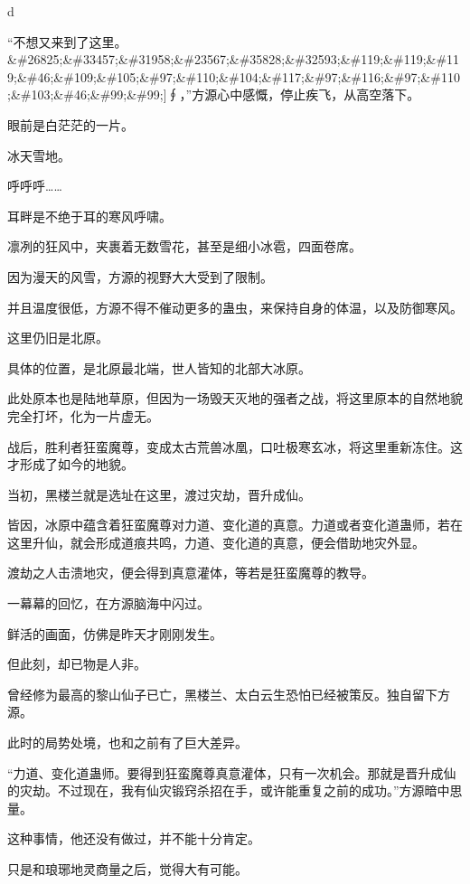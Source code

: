 
\begin{this_body}

d

“不想又来到了这里。\&\#26825;\&\#33457;\&\#31958;\&\#23567;\&\#35828;\&\#32593;\&\#119;\&\#119;\&\#119;\&\#46;\&\#109;\&\#105;\&\#97;\&\#110;\&\#104;\&\#117;\&\#97;\&\#116;\&\#97;\&\#110;\&\#103;\&\#46;\&\#99;\&\#99;]∮，”方源心中感慨，停止疾飞，从高空落下。

眼前是白茫茫的一片。

冰天雪地。

呼呼呼……

耳畔是不绝于耳的寒风呼啸。

凛冽的狂风中，夹裹着无数雪花，甚至是细小冰雹，四面卷席。

因为漫天的风雪，方源的视野大大受到了限制。

并且温度很低，方源不得不催动更多的蛊虫，来保持自身的体温，以及防御寒风。

这里仍旧是北原。

具体的位置，是北原最北端，世人皆知的北部大冰原。

此处原本也是陆地草原，但因为一场毁天灭地的强者之战，将这里原本的自然地貌完全打坏，化为一片虚无。

战后，胜利者狂蛮魔尊，变成太古荒兽冰凰，口吐极寒玄冰，将这里重新冻住。这才形成了如今的地貌。

当初，黑楼兰就是选址在这里，渡过灾劫，晋升成仙。

皆因，冰原中蕴含着狂蛮魔尊对力道、变化道的真意。力道或者变化道蛊师，若在这里升仙，就会形成道痕共鸣，力道、变化道的真意，便会借助地灾外显。

渡劫之人击溃地灾，便会得到真意灌体，等若是狂蛮魔尊的教导。

一幕幕的回忆，在方源脑海中闪过。

鲜活的画面，仿佛是昨天才刚刚发生。

但此刻，却已物是人非。

曾经修为最高的黎山仙子已亡，黑楼兰、太白云生恐怕已经被策反。独自留下方源。

此时的局势处境，也和之前有了巨大差异。

“力道、变化道蛊师。要得到狂蛮魔尊真意灌体，只有一次机会。那就是晋升成仙的灾劫。不过现在，我有仙灾锻窍杀招在手，或许能重复之前的成功。”方源暗中思量。

这种事情，他还没有做过，并不能十分肯定。

只是和琅琊地灵商量之后，觉得大有可能。


\end{this_body}
